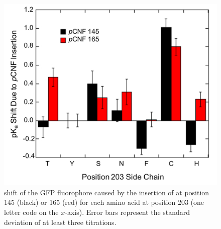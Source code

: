 \begin{figure}
    \center
    \includegraphics[width=\single]{figures-gfp-pKa/pKa_by_side_chain.png}
    \caption{
        \pKa{} shift of the GFP fluorophore caused by the insertion of \pCNF{} at position 145 (black) or 165 (red) for each amino acid at position 203 (one letter code on the $x$-axis). 
        Error bars represent the standard deviation of at least three titrations.
    }
    \label{fig:pKa_sidechain}
\end{figure}

